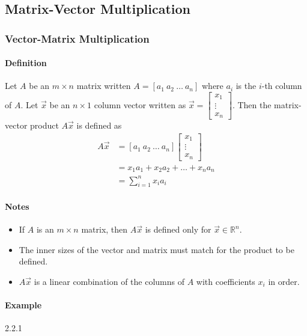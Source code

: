 \subsection*{Matrix-Vector Multiplication}
\hrulefill
\subsubsection*{Vector-Matrix Multiplication}
\paragraph*{Definition}
Let $A$ be an $m \times n$ matrix written $A = [a_1 \ a_2 \ \ldots \ a_n]$ where $a_i$ is the $i$-th column of $A$. 
Let $\vec{x}$ be an $n \times 1$ column vector written as $\vec{x} = \begin{bmatrix}
    x_1 \\
    \vdots \\
    x_n
\end{bmatrix}$. Then the matrix-vector product $A\vec{x}$ is defined as
\begin{align*}
    A\vec{x} &= [a_1 \ a_2 \ \ldots \ a_n] \begin{bmatrix}
    x_1 \\
    \vdots \\
    x_n
\end{bmatrix} \\
&= x_1a_1 + x_2a_2 + \ldots + x_na_n \\
&= \sum_{i=1}^n x_ia_i
\end{align*}

\paragraph*{Notes}
\begin{itemize}
    \item If $A$ is an $m \times n$ matrix, then $A\vec{x}$ is defined only for $\vec{x} \in \mathbb{R}^n$.
    \item The inner sizes of the vector and matrix must match for the product to be defined.
    \item $A\vec{x}$ is a linear combination of the columns of $A$ with coefficients $x_i$ in order.
\end{itemize}

\paragraph*{Example} 2.2.1

